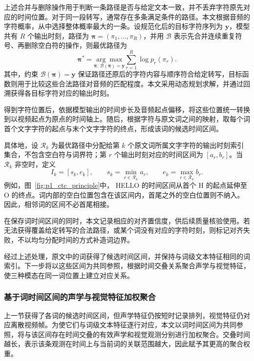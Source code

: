 上述合并与删除操作用于判断一条路径是否与给定文本一致，并不丢弃字符原先对应的时间位置。对于同一段转写，通常存在多条满足条件的路径。本文根据音频的字符概率，从中选择整体概率最大的一条。设规范化后的目标字符序列为 $\boldsymbol{y}$，模型共有 $R$ 个输出时刻，路径为
$\boldsymbol{\pi}=(\pi_1,\ldots,\pi_R)$，并用
$\mathcal{B}$ 表示先合并连续重复符号、再删除空白符的操作，则最优路径为
\begin{equation}
\boldsymbol{\pi}^{*}
=
\underset{
\boldsymbol{\pi}:\,
\mathcal{B}(\boldsymbol{\pi})=\boldsymbol{y}
}{\arg\max}
\sum_{r=1}^{R}\log p_r(\pi_r).
\label{eq:p1_ctc_optimal_path}
\end{equation}
其中，约束
$\mathcal{B}(\boldsymbol{\pi})=\boldsymbol{y}$
保证路径还原后的字符内容与顺序符合给定转写，目标函数则用于比较这些合法路径对音频的匹配程度。本文采用动态规划求解，并通过回溯获得各目标字符对应的输出时刻。

得到字符位置后，依据模型输出的时间步长及音频起点偏移，将这些位置统一转换到以视频起点为原点的时间轴上。随后，根据字符与原文词之间的映射，取每个词首个文字字符的起点与末个文字字符的终点，形成该词的候选时间区间。

具体地，设 $\mathcal{R}_k$ 为最优路径中分配给第 $k$ 个原文词所属文字字符的输出时刻索引集合，不包含空白符与词界符；第 $r$ 个输出时刻对应的时间区间为 $[a_r,b_r]$。当 $\mathcal{R}_k$ 非空时，定义
\begin{equation}
I_k=[s_k,e_k],
\qquad
s_k=\min_{r\in\mathcal{R}_k}a_r,
\qquad
e_k=\max_{r\in\mathcal{R}_k}b_r.
\label{eq:p1_ctc_word_interval}
\end{equation}
例如，图~\ref{fig:p1_ctc_principle}中，
HELLO 的时间区间从首个 H 的起点延伸至
O 的终点。词内部的空白位置包含在该区间内，首尾之外的空白位置则不纳入。因此，相邻词的区间不必首尾相接。

在保存词时间区间的同时，本文记录相应的对齐置信度，供后续质量核验使用。若无法获得覆盖给定转写的合法路径，或某个词没有对应的字符时刻，则标记对齐失败，不以均匀分配时间的方式补造词边界。

经过上述处理，原文中的词获得了候选时间区间，并保持与词级文本特征相同的词索引。下一步将以这些区间为共同参照，根据时间交叠关系聚合声学与视觉特征，使三种模态在同一词位置上建立对应关系。



\subsubsection{基于词时间区间的声学与视觉特征加权聚合}

上一节获得了各词的候选时间区间，但声学特征仍按短时记录排列，视觉特征仍对应离散视频帧。为使它们与词级文本特征逐行对应，本文以词时间区间为共同参照，将与该区间存在时间交叠的有效声学和视觉观测分别进行加权聚合。交叠时间越长，表示该条观测在时间上与当前词的关联范围越大，因此赋予其更高的聚合权重。

